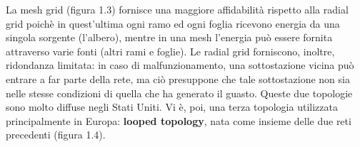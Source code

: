 \begin{figure}[h]
\end{figure}

La mesh grid (figura 1.3) fornisce una maggiore affidabilità rispetto alla radial grid poichè in quest'ultima ogni ramo ed ogni foglia ricevono energia da una singola sorgente (l'albero), mentre in una mesh l'energia può essere fornita attraverso varie fonti (altri rami e foglie). \newline
Le radial grid forniscono, inoltre, ridondanza limitata: in caso di malfunzionamento, una sottostazione vicina può entrare a far parte della rete, ma ciò presuppone che tale sottostazione non sia nelle stesse condizioni di quella che ha generato il guasto. \newline
Queste due topologie sono molto diffuse negli Stati Uniti.
Vi è, poi, una terza topologia utilizzata principalmente in Europa: \textbf{looped topology}, nata come insieme delle due reti precedenti (figura 1.4). 

